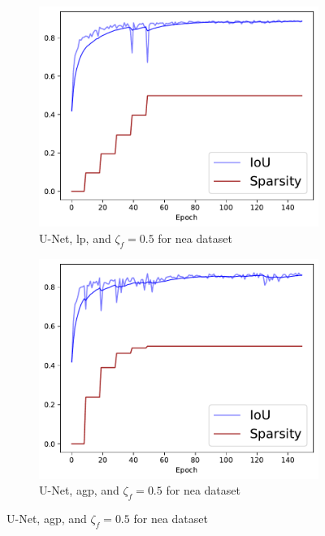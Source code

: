 \documentclass[mathematics,article,submit,pdftex,moreauthors]{Definitions/mdpi}
\begin{document}
\begin{figure}[!ht]
    \centering
      \begin{subfigure}[t]{.29\textwidth}
        \centering
        \includegraphics[width=.95\linewidth]{figures/pruning/unet_linear_0.5_NEAtraining_progress.pdf}
        \caption{U-Net, \ac{lp}, and $\zeta_f=0.5$ for \ac{nea} dataset}
        \label{fig:results:pruning:iou:unet-lp-0.5-nea}
      \end{subfigure}
      \hfill
      \begin{subfigure}[t]{.29\textwidth}
        \centering
        \includegraphics[width=.95\linewidth]{figures/pruning/unet_agp_0.5_NEAtraining_progress.pdf}
        \caption{U-Net, \ac{agp}, and $\zeta_f=0.5$ for \ac{nea} dataset}

\end{subfigure}
\end{figure}
\end{document}
